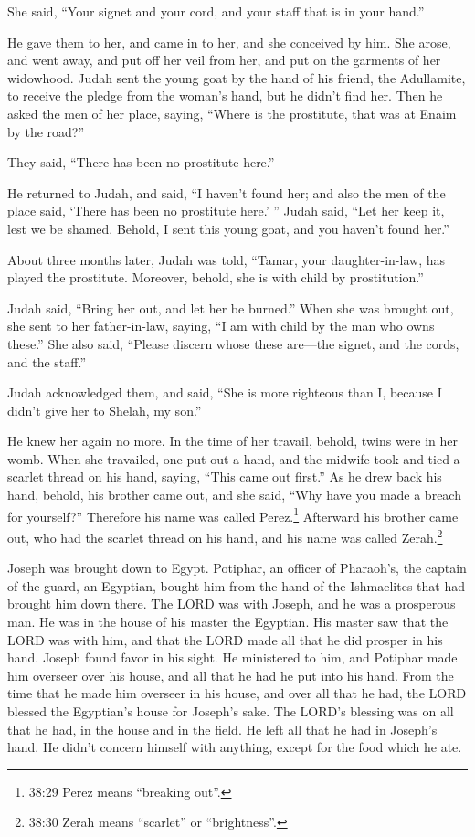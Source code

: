 She said, “Your signet and your cord, and your staff that is in your hand.”

He gave them to her, and came in to her, and she conceived by him.   \myverse{}She arose, and went away, and put off her veil from her, and put on the garments of her widowhood.   \myverse{}Judah sent the young goat by the hand of his friend, the Adullamite, to receive the pledge from the woman’s hand, but he didn’t find her.   \myverse{}Then he asked the men of her place, saying, “Where is the prostitute, that was at Enaim by the road?”

They said, “There has been no prostitute here.”

\myverse{}He returned to Judah, and said, “I haven’t found her; and also the men of the place said, ‘There has been no prostitute here.’ ”   \myverse{}Judah said, “Let her keep it, lest we be shamed. Behold, I sent this young goat, and you haven’t found her.”

\myverse{}About three months later, Judah was told, “Tamar, your daughter-in-law, has played the prostitute. Moreover, behold, she is with child by prostitution.”

Judah said, “Bring her out, and let her be burned.”   \myverse{}When she was brought out, she sent to her father-in-law, saying, “I am with child by the man who owns these.” She also said, “Please discern whose these are—the signet, and the cords, and the staff.”

\myverse{}Judah acknowledged them, and said, “She is more righteous than I, because I didn’t give her to Shelah, my son.”

He knew her again no more.   \myverse{}In the time of her travail, behold, twins were in her womb.   \myverse{}When she travailed, one put out a hand, and the midwife took and tied a scarlet thread on his hand, saying, “This came out first.”   \myverse{}As he drew back his hand, behold, his brother came out, and she said, “Why have you made a breach for yourself?” Therefore his name was called Perez.\footnote{38:29 Perez means “breaking out”.}   \myverse{}Afterward his brother came out, who had the scarlet thread on his hand, and his name was called Zerah.\footnote{38:30 Zerah means “scarlet” or “brightness”.}

\mychapter{}
\myverse*{}Joseph was brought down to Egypt. Potiphar, an officer of Pharaoh’s, the captain of the guard, an Egyptian, bought him from the hand of the Ishmaelites that had brought him down there.   \myverse{}The LORD was with Joseph, and he was a prosperous man. He was in the house of his master the Egyptian.   \myverse{}His master saw that the LORD was with him, and that the LORD made all that he did prosper in his hand.   \myverse{}Joseph found favor in his sight. He ministered to him, and Potiphar made him overseer over his house, and all that he had he put into his hand.   \myverse{}From the time that he made him overseer in his house, and over all that he had, the LORD blessed the Egyptian’s house for Joseph’s sake. The LORD’s blessing was on all that he had, in the house and in the field.   \myverse{}He left all that he had in Joseph’s hand. He didn’t concern himself with anything, except for the food which he ate.

